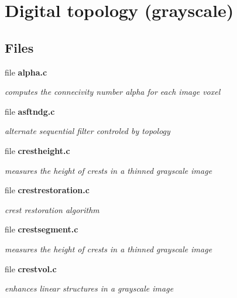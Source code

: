 \section{Digital topology (grayscale)}
\label{group__topogray}
\subsection*{Files}
\begin{CompactItemize}
\item 
file {\bf alpha.c}
\begin{CompactList}\small\item\em computes the connecivity number alpha for each image voxel \item\end{CompactList}

\item 
file {\bf asftndg.c}
\begin{CompactList}\small\item\em alternate sequential filter controled by topology \item\end{CompactList}

\item 
file {\bf crestheight.c}
\begin{CompactList}\small\item\em measures the height of crests in a thinned grayscale image \item\end{CompactList}

\item 
file {\bf crestrestoration.c}
\begin{CompactList}\small\item\em crest restoration algorithm \item\end{CompactList}

\item 
file {\bf crestsegment.c}
\begin{CompactList}\small\item\em measures the height of crests in a thinned grayscale image \item\end{CompactList}

\item 
file {\bf crestvol.c}
\begin{CompactList}\small\item\em enhances linear structures in a grayscale image \item\end{CompactList}


\end{CompactItemize}
